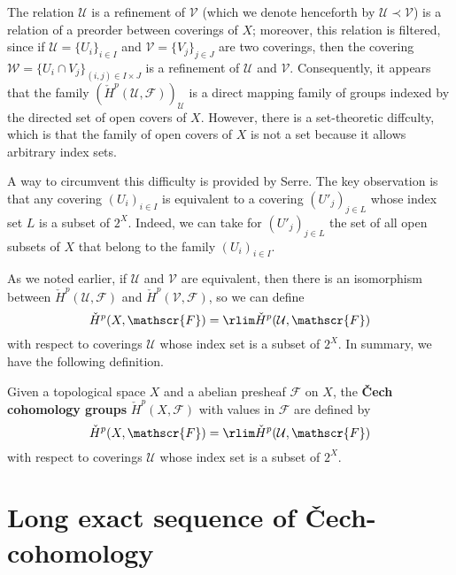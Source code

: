 The relation $\mathcal{U}$ is a refinement of $\mathcal{V}$ (which we denote henceforth by $\mathcal{U}\prec\mathcal{V}$) is a relation of a preorder between coverings of $X$; moreover, this relation is filtered, since if $\mathcal{U}=\{U_i\}_{i\in I}$ and $\mathcal{V}=\{V_j\}_{j\in J}$ are two coverings, then the covering $\mathcal{W}=\{U_i\cap V_j\}_{(i,j)\in I\times J}$ is a refinement of $\mathcal{U}$ and $\mathcal{V}$. Consequently, it appears that the family $(\check{H}^p(\mathcal{U},\mathscr{F}))_{\mathcal{U}}$ is a direct mapping family of groups indexed by the directed set of open covers of $X$. However, there is a set-theoretic diffculty, which is that the family of open covers of $X$ is not a set because it allows arbitrary index sets.\par
A way to circumvent this difficulty is provided by Serre. The key observation is that any covering $(U_i)_{i\in I}$ is equivalent to a covering $(U'_{j})_{j\in L}$ whose index set $L$ is a subset of $2^X$. Indeed, we can take for $(U'_{j})_{j\in L}$ the set of all open subsets of $X$ that belong to the family $(U_i)_{i\in I}$.\par
As we noted earlier, if $\mathcal{U}$ and $\mathcal{V}$ are equivalent, then there is an isomorphism between $\check{H}^p(\mathcal{U},\mathscr{F})$ and $\check{H}^p(\mathcal{V},\mathscr{F})$, so we can define
\[\check{H}^p(X,\mathscr{F})=\rlim\check{H}^p(\mathcal{U},\mathscr{F})\]
with respect to coverings $\mathcal{U}$ whose index set is a subset of $2^X$. In summary, we have the following definition.
\begin{definition}
Given a topological space $X$ and a abelian presheaf $\mathscr{F}$ on $X$, the \textbf{\v{C}ech cohomology groups} $\check{H}^p(X,\mathscr{F})$ with values in $\mathscr{F}$ are defined by
\[\check{H}^p(X,\mathscr{F})=\rlim\check{H}^p(\mathcal{U},\mathscr{F})\]
with respect to coverings $\mathcal{U}$ whose index set is a subset of $2^X$.
\end{definition}
\section{Long exact sequence of \v{C}ech-cohomology}
